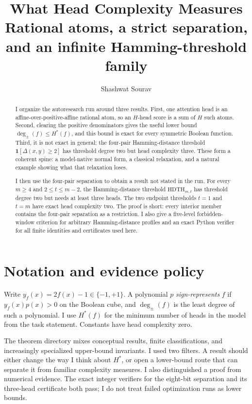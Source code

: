 \documentclass[10pt]{article}
\title{\vspace{-2.2em}\textbf{What Head Complexity Measures}\\
\large Rational atoms, a strict separation, and an infinite Hamming-threshold family}
\author{Shashwat Sourav}
\date{}
\theoremstyle{definition}
\theoremstyle{remark}
\newcommand{\Hstar}{H^{\ast}}
\newcommand{\tdeg}{\deg_{\pm}}
\newcommand{\HDTH}{\mathrm{HDTH}}
\begin{document}
\maketitle
\vspace{-1.5em}

\begin{abstract}
I organize the autoresearch run around three results. First, one attention head is an
affine-over-positive-affine rational atom, so an $H$-head score is a sum of $H$ such
atoms. Second, clearing the positive denominators gives the useful lower bound
$\tdeg(f)\leq \Hstar(f)$, and this bound is exact for every symmetric Boolean
function. Third, it is not exact in general: the four-pair Hamming-distance threshold
$\mathbf 1[\Delta(x,y)\geq2]$ has threshold degree two but head complexity three.
These form a coherent spine: a model-native normal form, a classical relaxation, and
a natural example showing what that relaxation loses.

I then use the four-pair separation to obtain a result not stated in the run. For every
$m\geq4$ and $2\leq t\leq m-2$, the Hamming-distance threshold
$\HDTH_{m,t}$ has threshold degree two but needs at least three heads. The two endpoint
thresholds $t=1$ and $t=m$ have exact head complexity two. The proof is short: every
interior member contains the four-pair separation as a restriction. I also give a
five-level forbidden-window criterion for arbitrary Hamming-distance profiles and an
exact Python verifier for all finite identities and certificates used here.
\end{abstract}

\section{Notation and evidence policy}

Write $y_f(x)=2f(x)-1\in\{-1,+1\}$. A polynomial $p$ \emph{sign-represents}
$f$ if $y_f(x)p(x)>0$ on the Boolean cube, and $\tdeg(f)$ is the least degree of
such a polynomial. I use $\Hstar(f)$ for the minimum number of heads in the model from
the task statement. Constants have head complexity zero.

The theorem directory mixes conceptual results, finite classifications, and increasingly
specialized upper-bound invariants. I used two filters. A result should either change the
way I think about $\Hstar$, or open a lower-bound route that can separate it from familiar
complexity measures. I also distinguished a proof from numerical evidence. The exact
integer verifiers for the eight-bit separation and its three-head certificate both pass;
I do not treat failed optimization runs as lower bounds.
\end{document}
